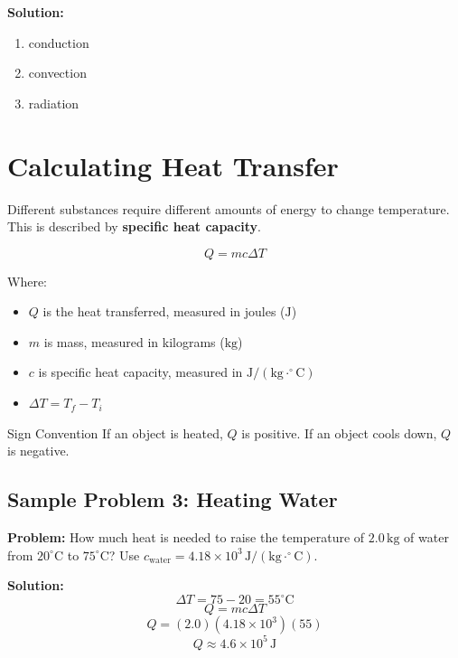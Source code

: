 \textbf{Solution:}
\begin{enumerate}
    \item conduction
    \item convection
    \item radiation
\end{enumerate}

\section{Calculating Heat Transfer}
Different substances require different amounts of energy to change temperature. This is described by \textbf{specific heat capacity}.

\begin{equation}
    Q = mc\Delta T
\end{equation}

Where:
\begin{itemize}
    \item $Q$ is the heat transferred, measured in joules ($\text{J}$)
    \item $m$ is mass, measured in kilograms ($\text{kg}$)
    \item $c$ is specific heat capacity, measured in $\text{J}/(\text{kg}\cdot^\circ\text{C})$
    \item $\Delta T = T_f - T_i$
\end{itemize}

\begin{keyidea}{Sign Convention}
If an object is heated, $Q$ is positive. If an object cools down, $Q$ is negative.
\end{keyidea}

\subsection*{Sample Problem 3: Heating Water}
\textbf{Problem:} How much heat is needed to raise the temperature of $2.0\,\text{kg}$ of water from $20^\circ \text{C}$ to $75^\circ \text{C}$? Use $c_{\text{water}} = 4.18 \times 10^3\,\text{J}/(\text{kg}\cdot^\circ\text{C})$.

\textbf{Solution:}
\begin{equation*}
    \Delta T = 75 - 20 = 55^\circ \text{C}
\end{equation*}
\begin{equation*}
    Q = mc\Delta T
\end{equation*}
\begin{equation*}
    Q = (2.0)(4.18 \times 10^3)(55)
\end{equation*}
\begin{equation*}
    Q \approx 4.6 \times 10^5\,\text{J}
\end{equation*}

